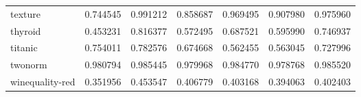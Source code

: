\begin{tabular}{lrrrrrr}
texture         &         0.744545 &  0.991212 &                  0.858687 &       0.969495 &                  0.907980 &       0.975960 \\
thyroid         &         0.453231 &  0.816377 &                  0.572495 &       0.687521 &                  0.595990 &       0.746937 \\
titanic         &         0.754011 &  0.782576 &                  0.674668 &       0.562455 &                  0.563045 &       0.727996 \\
twonorm         &         0.980794 &  0.985445 &                  0.979968 &       0.984770 &                  0.978768 &       0.985520 \\
winequality-red &         0.351956 &  0.453547 &                  0.406779 &       0.403168 &                  0.394063 &       0.402403 \\
\bottomrule
\end{tabular}
